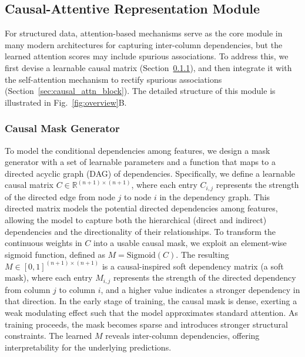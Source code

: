 \documentclass[conference]{IEEEtran}
\newcommand{\icde}[1]{{\color{black}#1}}
\newcommand{\done}[1]{{\color{black}#1}}
\newcommand{\rl}[1]{{\color{black}#1}}
\newcommand{\rln}[1]{{\color{black}#1}}
\newcommand{\rlend}[1]{{\color{black}#1}}
\newcommand{\syend}[1]{{\color{black}#1}}
\newcommand{\syadd}[1]{{\color{black}#1}}
\newcommand{\syfix}[1]{{\color{black}#1}}
\newcommand{\syne}[1]{{\color{black}#1}}
\newcommand{\vldb}[1]{{\color{black}#1}}
\newcommand{\syic}[1]{{\color{black}#1}}
\begin{document}
\subsection{Causal-Attentive Representation Module}\label{sec:causal_attentive}

\rlend{For structured data, attention-based mechanisms serve as the core module in many modern architectures for capturing inter-column dependencies\cite{r:autoint, r:tabm}, but the learned attention scores may include spurious associations.} \rln{To address this, we first devise a learnable causal matrix (Section~\ref{sec:causal_mask_gen}), 
and then integrate it with the self-attention mechanism to rectify spurious associations (Section~\ref{sec:causal_attn_block}). }\syend{ The detailed structure of this module is illustrated in Fig.~\ref{fig:overview}B.}

\subsubsection{Causal Mask Generator}\label{sec:causal_mask_gen}

\syadd{To model the \syic{conditional dependencies} among \syfix{features}, we design a mask generator with a set of learnable parameters
and a function 
that \syne{maps} to a directed acyclic graph (DAG) %
of \syic{dependencies}.
Specifically, we define} \rl{a learnable causal matrix} $C \in \mathbb{R}^{(n+1) \times (n+1)}$, 
where each entry $C_{i,j}$ represents the strength of the directed edge from node $j$ to node $i$ in the \syic{dependency} graph.
\done{This directed matrix models the potential \syic{directed dependencies} among \syfix{features}, allowing the model to capture both the hierarchical (direct and indirect) dependencies and the directionality of their relationships.
}
To transform the continuous weights in $C$ into a usable causal mask, \syend{we exploit an element-wise sigmoid function, defined as $M = \text{Sigmoid}(C)$. \syic{The resulting $M \in [0,1]^{(n+1)\times(n+1)}$ is a causal-inspired soft dependency matrix (a soft mask), where} each entry $M_{i,j}$ represents the strength of the directed dependency from column $j$ to column $i$, and a higher value indicates a stronger \syic{dependency} in that direction.}
\icde{In the early stage of training, the causal mask is dense, exerting a weak modulating effect} \vldb{such that the model approximates standard attention. As training proceeds, the mask becomes sparse and introduces stronger \syic{structural} constraints. The learned $M$ reveals inter-column \syic{dependencies}, offering interpretability for the underlying predictions.}
\end{document}
